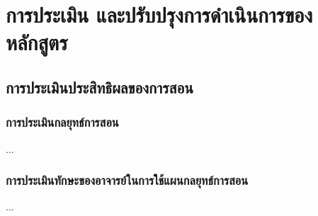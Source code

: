 \chapter{การประเมิน และปรับปรุงการดำเนินการของหลักสูตร}

\section{การประเมินประสิทธิผลของการสอน}

\subsection{การประเมินกลยุทธ์การสอน}

...

\subsection{การประเมินทักษะของอาจารย์ในการใช้แผนกลยุทธ์การสอน}

...

